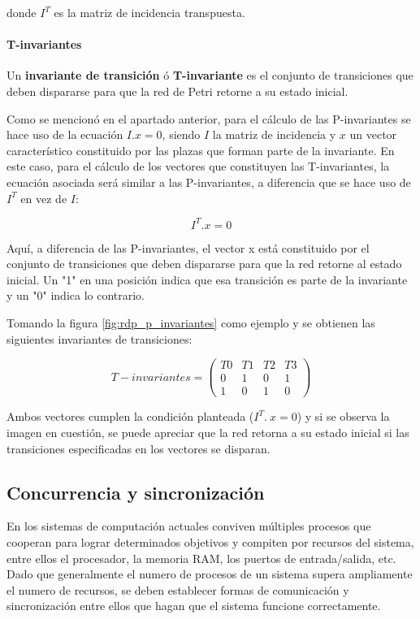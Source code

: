 \noindent donde $I^T$ es la matriz de incidencia transpuesta.

\paragraph{T-invariantes}
Un \textbf{invariante de transición} ó \textbf{T-invariante} es el conjunto de transiciones que deben dispararse para que la red de Petri retorne a su estado inicial.

Como se mencionó en el apartado anterior, para el cálculo de las P-invariantes se hace uso de la ecuación $I . x = 0$, siendo $I$ la matriz de incidencia y $x$ un vector característico constituido por las plazas que forman parte de la invariante. En este caso, para el cálculo de los vectores que constituyen las T-invariantes, la ecuación asociada será similar a las P-invariantes, a diferencia que se hace uso de  $I^T$ en vez de $I$:

\begin{equation}
    I^T . x = 0
\end{equation}

Aquí, a diferencia de las P-invariantes, el vector x está constituido por el conjunto de transiciones que deben dispararse para que la red retorne al estado inicial. Un "1" en una posición indica que esa transición es parte de la invariante y un "0" indica lo contrario.

Tomando la figura \ref{fig:rdp_p_invariantes} como ejemplo y se obtienen las siguientes invariantes de transiciones:

\begin{equation}
    T-invariantes = 
    \begin{pmatrix}
         T0 & T1 & T2 & T3  \\
         0 & 1 & 0 & 1  \\
         1 & 0 & 1 & 0  
    \end{pmatrix}
\end{equation}

Ambos vectores cumplen la condición planteada ($I^T .\ x = 0$) y si se observa la imagen en cuestión, se puede apreciar que la red retorna a su estado inicial si las transiciones especificadas en los vectores se disparan.

\subsection{Concurrencia y sincronización}
En los sistemas de computación actuales conviven múltiples procesos que cooperan para lograr determinados objetivos y compiten por recursos del sistema, entre ellos el procesador, la memoria RAM, los puertos de entrada/salida, etc.\\
Dado que generalmente el numero de procesos de un sistema supera ampliamente el numero de recursos, se deben establecer formas de comunicación y sincronización entre ellos que hagan que el sistema funcione correctamente. 

